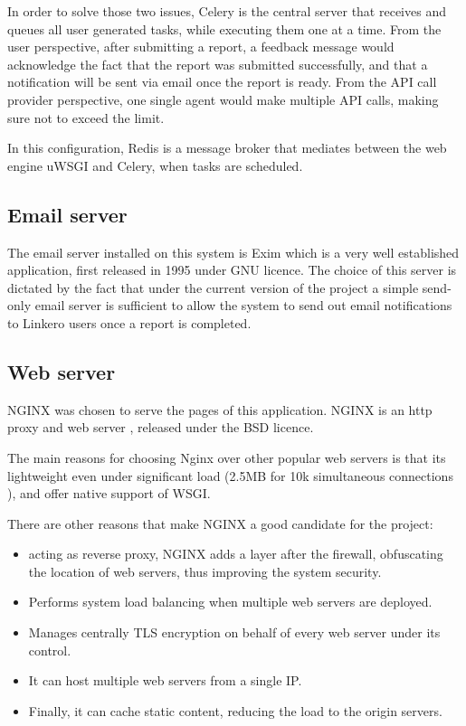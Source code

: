 In order to solve those two issues, Celery is the central server that receives
and queues all user generated tasks, while executing them one at a time. From
the user perspective, after submitting a report, a feedback message would
acknowledge the fact that the report was submitted successfully, and that a
notification will be sent via email once the report is ready. From the API call
provider perspective, one single agent would make multiple API calls, making
sure not to exceed the limit.

In this configuration, Redis is a message broker that mediates between the web
engine uWSGI and Celery, when tasks are scheduled.

\subsection{Email server}
The email server installed on this system is Exim \cite{exim} which is a very
well established application, first released in 1995 under GNU licence. The
choice of this server is dictated by the fact that under the current version of
the project a simple send-only email server is sufficient to allow the system to
send out email notifications to Linkero users once a report is completed.

\subsection{Web server}
NGINX was chosen to serve the pages of this application. NGINX is an http proxy
and web server \cite{Nginx}, released under the BSD licence.

The main reasons for choosing Nginx over other popular web servers is that its
lightweight even under significant load (2.5MB for 10k simultaneous connections
\cite{wkngx}), and offer native support of WSGI.

There are other reasons that make NGINX a good candidate for the project:
\begin{itemize}
  \item acting as reverse proxy, NGINX adds a layer after the firewall,
  obfuscating the location of web servers, thus improving the system security.
  \item Performs system load balancing when multiple web servers are deployed.
  \item Manages centrally TLS encryption on behalf of every web server under its
  control.
  \item It can host multiple web servers from a single IP.
  \item Finally, it can cache static content, reducing the load to the origin
  servers.
\end{itemize}

